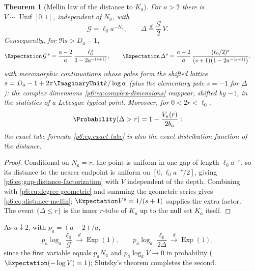 \documentclass[11pt,oneside]{article}
\numberwithin{equation}{section}
\newtheorem{theorem}{Theorem}[section]
\theoremstyle{definition}
\theoremstyle{remark}
\begin{document}
\begin{theorem}[Mellin law of the distance to $K_a$]
\label{p6:thm:distance-mellin}
For $a>2$ there is $V\sim\operatorname{Unif}[0,1]$, independent of $N_a$,
with
\begin{equation}\label{p6:eq:gap-distance-factorization}
 \mathcal G=\ell_0a^{-N_a},
 \qquad
 \Delta\overset d=\frac{\mathcal G}2\,V .
\end{equation}
Consequently, for $\Re s>D_a-1$,
\begin{equation}\label{p6:eq:distance-mellin}
 \Expectation\,\mathcal G^{\,s}
 =\frac{a-2}{a}\,\frac{\ell_0^{\,s}}{1-2a^{-(s+1)}},
 \qquad
 \Expectation\,\Delta^{s}
 =\frac{a-2}{a}\,
 \frac{(\ell_0/2)^{s}}{(s+1)\bigl(1-2a^{-(s+1)}\bigr)},
\end{equation}
with meromorphic continuations whose poles form the shifted lattice
$s=D_a-1+2\pi\ImaginaryUnit k/\log a$ (plus the elementary pole $s=-1$ for $\Delta$):
the complex dimensions \eqref{p6:eq:complex-dimensions} reappear, shifted by
$-1$, in the statistics of a Lebesgue-typical point.  Moreover, for
$0<2r<\ell_0$,
\begin{equation}\label{p6:eq:distance-tail-tube}
 \Probability(\Delta>r)=1-\frac{V_a(r)}{2b_a}:
\end{equation}
the exact tube formula \eqref{p6:eq:exact-tube} is also the exact
distribution function of the distance.
\end{theorem}

\begin{proof}
Conditional on $N_a=r$, the point is uniform in one gap of length
$\ell_0a^{-r}$, so its distance to the nearer endpoint is uniform on
$[0,\ell_0a^{-r}/2]$, giving \eqref{p6:eq:gap-distance-factorization} with
$V$ independent of the depth.  Combining with
\eqref{p6:eq:degree-geometric} and summing the geometric series gives
\eqref{p6:eq:distance-mellin}; $\Expectation V^s=1/(s+1)$ supplies the extra factor.
The event $\{\Delta\le r\}$ is the inner $r$-tube of $K_a$ up to the null set
$K_a$ itself.
\end{proof}

\begin{corollary}
\label{p6:cor:critical-gap-scale}
As $a\downarrow2$, with $p_a=(a-2)/a$,
\[
 p_a\log_a\frac{\ell_0}{\mathcal G}
 \xrightarrow{\ d\ }\operatorname{Exp}(1),
 \qquad
 p_a\log_a\frac{\ell_0}{2\Delta}
 \xrightarrow{\ d\ }\operatorname{Exp}(1),
\]
since the first variable equals $p_aN_a$ and
$p_a\log_a V\to0$ in probability ($\Expectation(-\log V)=1$); Slutsky's theorem
completes the second.
\end{corollary}
\end{document}
